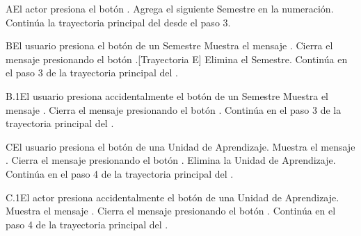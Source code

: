 \begin{UCtrayectoriaA}{A}{El actor presiona el botón \IUbutton{+}.}
	\UCpaso Agrega el siguiente Semestre en la numeración.
    \UCpaso Continúa la trayectoria principal del  desde el paso 3.
\end{UCtrayectoriaA}
\begin{UCtrayectoriaA}{B}{El usuario presiona el botón  de un Semestre}
	\UCpaso  Muestra el mensaje .
	\UCpaso[\UCactor] Cierra el mensaje presionando el botón .[Trayectoria E]
	\UCpaso Elimina el Semestre.
    \UCpaso Continúa en el paso 3 de la trayectoria principal del .
\end{UCtrayectoriaA}
\begin{UCtrayectoriaA}{B.1}{El usuario presiona accidentalmente el botón  de un Semestre}
	\UCpaso  Muestra el mensaje .
	\UCpaso[\UCactor] Cierra el mensaje presionando el botón .
    \UCpaso Continúa en el paso 3 de la trayectoria principal del .
\end{UCtrayectoriaA}
\begin{UCtrayectoriaA}{C}{El usuario presiona el botón  de una Unidad de Aprendizaje.}
	\UCpaso  Muestra el mensaje .
	\UCpaso[\UCactor] Cierra el mensaje presionando el botón .
	\UCpaso Elimina la Unidad de Aprendizaje.
    \UCpaso Continúa en el paso 4 de la trayectoria principal del .
\end{UCtrayectoriaA}
\begin{UCtrayectoriaA}{C.1}{El actor presiona accidentalmente el botón  de una Unidad de Aprendizaje.}
	\UCpaso Muestra el mensaje .
	\UCpaso[\UCactor] Cierra el mensaje presionando el botón .
    \UCpaso Continúa en el paso 4 de la trayectoria principal del .
\end{UCtrayectoriaA}


